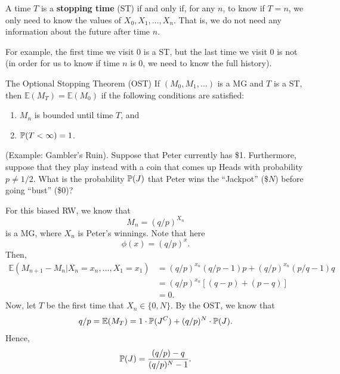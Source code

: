 \begin{definition}{}{}
    A time $T$ is a \textbf{stopping time} (ST) if and only if, for any $n$, to know if $T = n$, we only need to know the values of $X_0, X_1, \dots, X_n$. That is, we do not need any information about the future after time $n$. 
\end{definition}
For example, the first time we visit 0 is a ST, but the last time we visit 0 is not (in order for us to know if time $n$ is 0, we need to know the full history).

\begin{theorem}{The Optional Stopping Theorem (OST)}{}
    If $(M_0, M_1, \dots)$ is a MG and $T$ is a ST, then $\mathbb{E}(M_T) = \mathbb{E}(M_0)$ if the following conditions are satisfied: 
    \begin{enumerate}
        \item $M_n$ is bounded until time $T$, and 
        \item $\mathbb{P}(T < \infty) = 1$. 
    \end{enumerate}
\end{theorem}

\begin{mdframed}[]
    (Example: Gambler's Ruin). Suppose that Peter currently has \$1. Furthermore, suppose that they play instead with a coin that comes up Heads with probability $p \neq 1/2$. What is the probability $\mathbb{P}(J)$ that Peter wins the ``Jackpot'' ($\$N$) before going ``bust'' (\$0)?

    \begin{mdframed}[]
        For this biased RW, we know that \[M_n = (q / p)^{X_n}\] is a MG, where $X_n$ is Peter's winnings. Note that here \[\phi(x) = (q / p)^x.\] Then, 
        \begin{equation*}
            \begin{aligned}
                \mathbb{E}(M_{n + 1} - M_{n} | X_n = x_n, \dots, X_1 = x_1) &= (q / p)^{x_n} (q / p - 1)p + (q / p)^{x_n} (p / q - 1)q \\ 
                    &= (q / p)^{x_n}[(q - p) + (p - q)] \\ 
                    &= 0.
            \end{aligned}
        \end{equation*}
        Now, let $T$ be the first time that $X_n \in \{0, N\}$. By the OST, we know that \[q / p = \mathbb{E}(M_T) = 1 \cdot \mathbb{P}(J^C) + (q / p)^N \cdot \mathbb{P}(J).\]
        Hence, \[\mathbb{P}(J) = \frac{(q / p) - q}{(q / p)^N - 1}.\]
    \end{mdframed}
\end{mdframed}